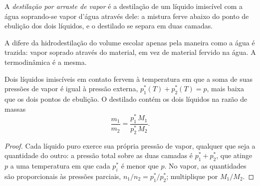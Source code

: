 \begin{definition}\label{def:b2:liquid-vapour-diagrams:steam-distillation}
A \emph{destilação por arraste de vapor} é a destilação de um
líquido imiscível com a água soprando-se vapor d'água através dele: a mistura
ferve abaixo do ponto de ebulição dos dois líquidos, e o destilado se separa
em duas camadas.
\end{definition}

A  difere da hidrodestilação do volume escolar
apenas pela maneira como a água é trazida: vapor soprado através do material,
em vez de material fervido na água. A termodinâmica é a mesma.

\begin{proposition}\label{prop:b2:liquid-vapour-diagrams:steam}
Dois líquidos imiscíveis em contato fervem à temperatura em que a soma de
suas pressões de vapor é igual à pressão externa, $p_1^*(T) + p_2^*(T) =
p$, mais baixa que os dois pontos de ebulição. O destilado contém os dois
líquidos na razão de massas
\[
  \frac{m_1}{m_2} = \frac{p_1^*\,M_1}{p_2^*\,M_2} .
\]
\end{proposition}

\begin{proof}
Cada líquido puro exerce sua própria pressão de vapor, qualquer que seja a
quantidade do outro: a pressão total sobre as duas camadas é $p_1^* + p_2^*$,
que atinge $p$ a uma temperatura em que cada $p_i^*$ é menor que $p$. No
vapor, as quantidades são proporcionais às pressões parciais, $n_1/n_2 =
p_1^*/p_2^*$; multiplique por $M_1/M_2$.
\end{proof}

